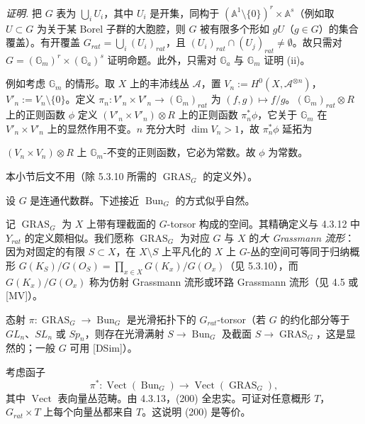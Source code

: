 \emph{证明.} 把 $G$ 表为 $\bigcup_{i}U_{i}$，其中 $U_{i}$ 是开集，同构于 $(\mathbb{A}^{1}\setminus\{0\})^{r}\times\mathbb{A}^{s}$（例如取 $U\subset G$ 为关于某 Borel 子群的大胞腔，则 $G$ 被有限多个形如 $gU$（$g\in G$）的集合覆盖）。有开覆盖 $G_{rat}=\bigcup_{i}(U_{i})_{rat}$，且 $(U_{i})_{rat}\cap(U_{j})_{rat}\neq\emptyset$。故只需对 $G=(\mathbb{G}_{m})^{r}\times(\mathbb{G}_{a})^{s}$ 证明命题。此外，只需对 $\mathbb{G}_{a}$ 与 $\mathbb{G}_{m}$ 证明 (ii)。

例如考虑 $\mathbb{G}_{m}$ 的情形。取 $X$ 上的丰沛线丛 $\mathcal{A}$，置 $V_{n}:=H^{0}(X,\mathcal{A}^{\otimes n})$，$V'_{n}:=V_{n}\setminus\{0\}$。定义 $\pi_{n}:V'_{n}\times V'_{n}\to(\mathbb{G}_{m})_{rat}$ 为 $(f,g)\mapsto f/g$。$(\mathbb{G}_{m})_{rat}\otimes R$ 上的正则函数 $\phi$ 定义 $(V'_{n}\times V'_{n})\otimes R$ 上的正则函数 $\pi_{n}^{*}\phi$，它关于 $\mathbb{G}_{m}$ 在 $V'_{n}\times V'_{n}$ 上的显然作用不变。$n$ 充分大时 $\dim V_{n}>1$，故 $\pi_{n}^{*}\phi$ 延拓为

$(V_{n}\times V_{n})\otimes R$ 上 $\mathbb{G}_{m}$-不变的正则函数，它必为常数。故 $\phi$ 为常数。

 本小节后文不用（除 5.3.10 所需的 $\operatorname{GRAS}_{G}$ 的定义外）。

设 $G$ 是连通代数群。下述接近 $\operatorname{Bun}_{G}$ 的方式似乎自然。

记 $\operatorname{GRAS}_{G}$ 为 $X$ 上带有理截面的 $G$-torsor 构成的空间。其精确定义与 4.3.12 中 $Y_{rat}$ 的定义颇相似。我们愿称 $\operatorname{GRAS}_{G}$ 为对应 $G$ 与 $X$ 的\emph{大 Grassmann 流形}：因为对固定的有限 $S\subset X$，在 $X\setminus S$ 上平凡化的 $X$ 上 $G$-丛的空间可等同于归纳概形 $G(K_{S})/G(O_{S})=\prod_{x\in X}G(K_{x})/G(O_{x})$（见 5.3.10），而 $G(K_{x})/G(O_{x})$ 称为仿射 Grassmann 流形或环路 Grassmann 流形（见 4.5 或 [MV]）。

态射 $\pi:\operatorname{GRAS}_{G}\to\operatorname{Bun}_{G}$ 是光滑拓扑下的 $G_{rat}$-torsor（若 $G$ 的约化部分等于 $GL_{n}$、$SL_{n}$ 或 $Sp_{n}$，则存在光滑满射 $S\to\operatorname{Bun}_{G}$ 及截面 $S\to\operatorname{GRAS}_{G}$，这是显然的；一般 $G$ 可用 [DSim]）。

考虑函子
\begin{equation}\tag{200}
\pi^{*}:\operatorname{Vect}(\operatorname{Bun}_{G})\to\operatorname{Vect}(\operatorname{GRAS}_{G}),
\end{equation}
其中 $\operatorname{Vect}$ 表向量丛范畴。由 4.3.13，(200) 全忠实。可证对任意概形 $T$，$G_{rat}\times T$ 上每个向量丛都来自 $T$。这说明 (200) 是等价。

